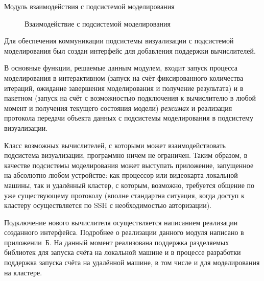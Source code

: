 \documentclass[a4paper,12pt]{extarticle}
\begin{document}
\begin{subsection}{Модуль взаимодействия с подсистемой моделирования}
    \label{sec:architecture-calc}
    \begin{figure}[h]
        \caption{Взаимодействие с подсистемой моделирования}
        \label{ris:architecture-calc}
    \end{figure}
    
    Для обеспечения коммуникации подсистемы визуализации с подсистемой моделирования был создан интерфейс для добавления поддержки вычислителей.

    В основные функции, решаемые данным модулем, входит запуск процесса моделирования в интерактивном (запуск на счёт фиксированного количества итераций, ожидание завершения моделирования и получение результата) и в пакетном (запуск на счёт с возможностью подключения к вычислителю в любой момент и получения текущего состояния модели) \textit{режимах} и реализация протокола передачи объекта данных с подсистемы моделирования в подсистему визуализации.

    Класс возможных вычислителей, с которыми может взаимодействовать подсистема визуализации, программно ничем не ограничен. Таким образом, в качестве подсистемы моделирования может выступать приложение, запущенное на абсолютно любом устройстве: как процессор или видеокарта локальной машины, так и удалённый кластер, с которым, возможно, требуется общение по уже существующему протоколу (вполне стандартна ситуация, когда доступ к кластеру осуществляется по SSH с необходимостью авторизации).

    Подключение нового вычислителя осуществляется написанием реализации созданного интерфейса. Подробнее о реализации данного модуля написано в приложении~Б. На данный момент реализована поддержка разделяемых библиотек для запуска счёта на локальной машине и в процессе разработки поддержка запуска счёта на удалённой машине, в том числе и для моделирования на кластере.

\end{subsection}
\end{document}
